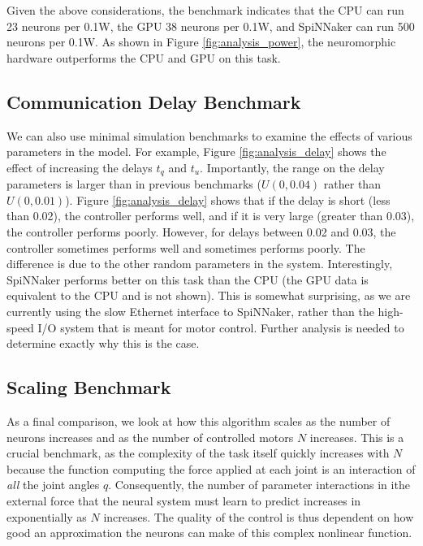 \documentclass{frontiersSCNS} %
\begin{document}
Given the above considerations, the benchmark indicates that the CPU can run 23 neurons per 0.1W,
the GPU 38 neurons per 0.1W, and SpiNNaker can run 500 neurons per 0.1W.  
As shown in Figure \ref{fig:analysis_power}, the neuromorphic hardware
outperforms the CPU and GPU on this task.

\subsection{Communication Delay Benchmark}

We can also use minimal simulation benchmarks to examine the effects of various
parameters in the model.  For example, Figure \ref{fig:analysis_delay}
shows the effect of increasing the delays $t_q$ and $t_u$.
Importantly, the range on the delay parameters is larger than in previous benchmarks ($U(0, 0.04)$
rather than $U(0, 0.01)$).  Figure \ref{fig:analysis_delay} shows that if the delay is short (less than 0.02), the controller performs well, and if it is very large (greater than 0.03),
the controller performs poorly.  However, for delays between 0.02 and 0.03,
the controller sometimes performs well and sometimes performs poorly.  The
difference is due to the other random parameters in the system.  Interestingly,
SpiNNaker performs better on this
task than the CPU (the GPU data is equivalent to the CPU and is not shown).  
This is somewhat surprising, as we are currently using the slow
Ethernet interface to SpiNNaker, rather than the high-speed I/O system that
is meant for motor control.  Further analysis is needed to determine exactly why this is the case.

\subsection{Scaling Benchmark}

As a final comparison, we look at how this algorithm scales as the number
of neurons increases and as the number of controlled motors $N$ increases.  This
is a crucial benchmark, as the complexity of the task itself quickly
increases with $N$ because the function computing the force applied
at each joint is an interaction of \emph{all} the joint angles $q$.  Consequently,
the number of parameter interactions in ithe external force that the neural system must learn to predict increases
in exponentially as $N$ increases.  The quality of the control
is thus dependent on how good an approximation the neurons can make of this
complex nonlinear function.
\end{document}
